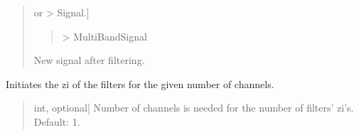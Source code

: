 \documentclass[letterpaper,10pt,english]{sphinxmanual}
\begin{document}
\begin{fulllineitems}
\begin{fulllineitems}
\begin{quote}
\begin{description}
\begin{description}
\end{description}

\begin{description}
\sphinxlineitem{\sphinxstylestrong{new\_sig}}{[} or  \sphinxhyphen{}\textgreater{} Signal.{]}\begin{quote}

\sphinxAtStartPar
{} \sphinxhyphen{}\textgreater{} MultiBandSignal
\end{quote}

\sphinxAtStartPar
New signal after filtering.

\end{description}

\end{description}\end{quote}

\end{fulllineitems}


\begin{fulllineitems}
\label{\detokenize{classes:dsptools.classes.filterbank.FilterBank.initialize_zi}}
\pysigstartsignatures
{}
\pysigstopsignatures
\sphinxAtStartPar
Initiates the zi of the filters for the given number of channels.
\begin{quote}\begin{description}
\begin{description}
\sphinxlineitem{\sphinxstylestrong{number\_of\_channels}}{[}int, optional{]}
\sphinxAtStartPar
Number of channels is needed for the number of filters’ zi’s.
Default: 1.

\end{description}

\end{description}\end{quote}

\end{fulllineitems}



\end{fulllineitems}
\end{document}
